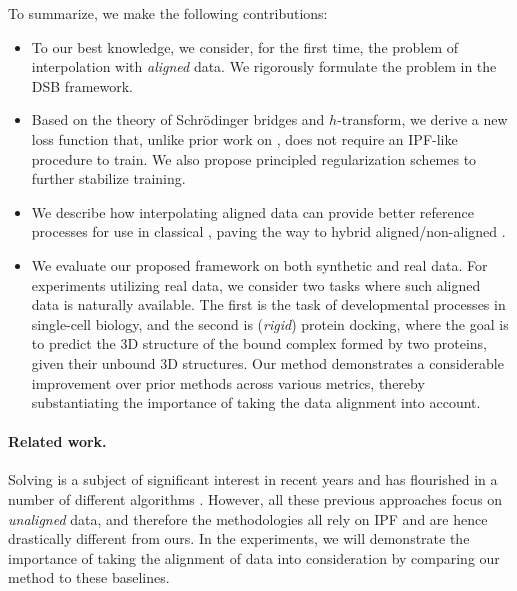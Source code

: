 To summarize, we make the following contributions:
\begin{itemize}[topsep=0pt]
\item To our best knowledge, we consider, for the first time, the problem of interpolation with \emph{aligned} data. We rigorously formulate the problem in the \acrshort{DSB} framework.

\item Based on the theory of Schr\"odinger bridges and $h$-transform, we derive a new loss function that, unlike prior work on , does not require an \acrshort{IPF}-like procedure to train. We also propose principled regularization schemes to further stabilize training.

\item We describe how interpolating aligned data can provide better reference processes for use in classical , paving the way to hybrid aligned/non-aligned .

\item {} We evaluate our proposed framework on both synthetic and real data. For experiments utilizing real data, we consider two tasks where such aligned data is naturally available. The first is the task of developmental processes in single-cell biology, and the second is ({\em rigid}) protein docking, where the goal is to predict the 3D structure of the bound complex formed by two proteins, given their unbound 3D structures. Our method demonstrates a considerable improvement over prior methods across various metrics, thereby substantiating the importance of taking the data alignment into account. 

\end{itemize}

\paragraph{Related work.}

Solving  is a subject of significant interest in recent years and has flourished in a number of different algorithms \citep{de2021diffusion,chen2021likelihood,vargas2021solving,bunne2022recovering,liu2022deep}. However, all these previous approaches focus on  \emph{unaligned} data, and therefore the methodologies all rely on \acrshort{IPF} and are hence drastically different from ours. In the experiments, we will demonstrate the importance of taking the alignment of data into consideration by comparing our method to these baselines.

